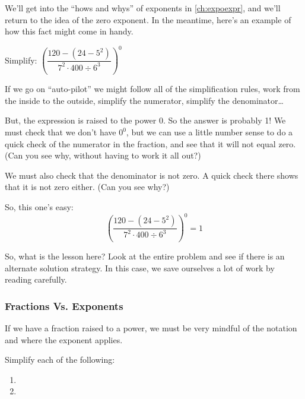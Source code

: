 We'll get into the ``hows and whys'' of exponents in \cref{ch:expoexpr}, and we'll return to the idea of the zero exponent. In the meantime, here's an example of how this fact might come in handy.

\begin{boxedex}
Simplify: $\left( \dfrac{120-(24-5^2)}{7^2 \cdot 400 \div 6^3} \right)^0$

\exsoln If we go on ``auto-pilot'' we might follow all of the simplification rules, work from the inside to the outside, simplify the numerator, simplify the denominator\ldots

But, the expression is raised to the power 0. So the answer is probably 1! We must check that we don't have $0^0$, but we can use a little number sense to do a quick check of the numerator in the fraction, and see that it will not equal zero. (Can you see why, without having to work it all out?)

We must also check that the denominator is not zero. A quick check there shows that it is not zero either. (Can you see why?)

So, this one's easy:
\[\left( \frac{120-(24-5^2)}{7^2 \cdot 400 \div 6^3} \right)^0 = 1\]

So, what is the lesson here? Look at the entire problem and see if there is an alternate solution strategy. In this case, we save ourselves a lot of work by reading carefully.
\end{boxedex}

\subsubsection*{Fractions Vs. Exponents}

If we have a fraction raised to a power, we must be very mindful of the notation and where the exponent applies.

\begin{boxedex}
Simplify each of the following:

\begin{enumerate}[itemsep=10pt]
\item {}

\item {}
\end{enumerate}
\end{boxedex}

